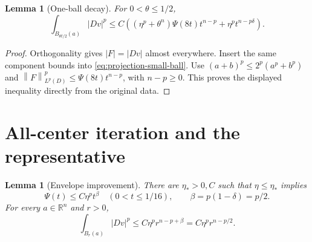\documentclass[reqno,11pt]{amsart}
\numberwithin{equation}{section}
\newtheorem{lemma}[theorem]{Lemma}
\theoremstyle{definition}
\theoremstyle{remark}
\newcommand{\R}{\mathbb R}
\newcommand{\norm}[1]{\left\lVert#1\right\rVert}
\begin{document}
\begin{lemma}[One-ball decay]\label{lem:one-ball}
For $0<\theta\leq1/2$,
\begin{equation}\label{eq:one-ball}
 \int_{B_{\theta t/2}(a)}|Dv|^p
 \leq C\left((\eta^p+\theta^n)\Psi(8t)t^{n-p}
                    +\eta^pt^{n-p\delta}\right).
\end{equation}
\end{lemma}
\begin{proof}
Orthogonality gives $|F|=|Dv|$ almost everywhere. Insert the same
component bounds into \eqref{eq:projection-small-ball}. Use
$(a+b)^p\leq2^p(a^p+b^p)$ and
$\norm F_{L^p(D)}^p\leq\Psi(8t)t^{n-p}$, with $n-p\geq0$.
This proves the displayed inequality directly from the original data.
\end{proof}

\section{All-center iteration and the representative}\label{sec:iteration}
\begin{lemma}[Envelope improvement]\label{lem:envelope}
There are $\eta_*>0,C$ such that $\eta\leq\eta_*$ implies
\begin{equation}\label{eq:power-growth}
 \Psi(t)\leq C\eta^pt^\beta\quad(0<t\leq1/16),
 \qquad\beta=p(1-\delta)=p/2.
\end{equation}
For every $a\in\R^n$ and $r>0$,
\begin{equation}\label{eq:gradient-growth}
 \int_{B_r(a)}|Dv|^p\leq C\eta^pr^{n-p+\beta}
                         =C\eta^pr^{n-p/2}.
\end{equation}
\end{lemma}
\end{document}
